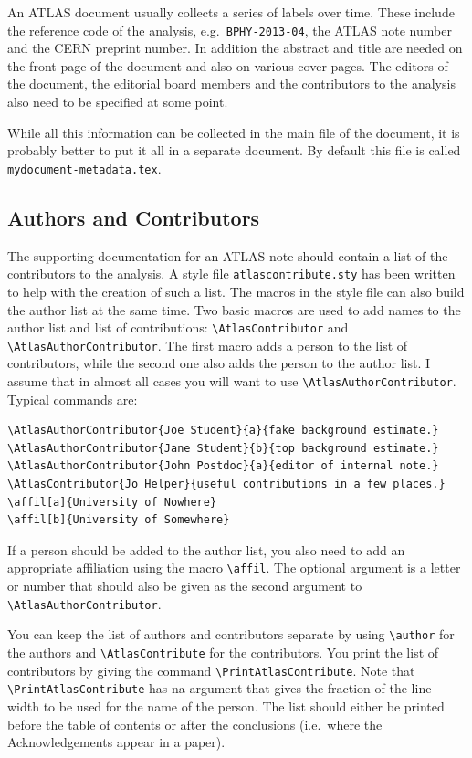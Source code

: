 \documentclass[atlasstyle,UKenglish]{latex/atlasdoc}
\newcommand{\Macro}[1]{\texttt{\textbackslash #1}\xspace}
\newcommand{\Package}[1]{\texttt{#1}\xspace}
\begin{document}
An ATLAS document usually collects a series of labels over time.
These include the reference code of the analysis, e.g.\ \texttt{BPHY-2013-04}, 
the ATLAS note number and the CERN preprint number.
In addition the abstract and title are needed on the front page of the document and also on various cover pages.
The editors of the document, the editorial board members and the contributors to the analysis
also need to be specified at some point.

While all this information can be collected in the main file of the document, 
it is probably better to put it all in a separate document.
By default this file is called \texttt{mydocument-metadata.tex}.


\subsection{Authors and Contributors}
\label{sec:contribute}

The supporting documentation for an ATLAS note should contain a list of the contributors to the analysis.
A style file \Package{atlascontribute.sty} has been written to help with the creation of such a list.
The macros in the style file can also build the author list at the same time.
Two basic macros are used to add names to the author list and list of contributions:
\Macro{AtlasContributor} and \Macro{AtlasAuthorContributor}. 
The first macro adds a person to the list of contributors, while the second one also adds the person
to the author list. I assume that in almost all cases you will want to use \Macro{AtlasAuthorContributor}.
Typical commands are:
\begin{verbatim}
\AtlasAuthorContributor{Joe Student}{a}{fake background estimate.}
\AtlasAuthorContributor{Jane Student}{b}{top background estimate.}
\AtlasAuthorContributor{John Postdoc}{a}{editor of internal note.}
\AtlasContributor{Jo Helper}{useful contributions in a few places.}
\affil[a]{University of Nowhere}
\affil[b]{University of Somewhere}
\end{verbatim}
If a person should be added to the author list, you also need to add an appropriate affiliation using the macro \Macro{affil}.
The optional argument is a letter or number that should also be given as the second argument to
\Macro{AtlasAuthorContributor}.

You can keep the list of authors and contributors separate
by using \Macro{author} for the authors and \Macro{AtlasContribute} for the contributors.
You print the list of contributors by giving the command \Macro{PrintAtlasContribute}.
Note that \Macro{PrintAtlasContribute} has na argument that gives the fraction of the line width
to be used for the name of the person.
The list should either be printed before the table of contents or after the conclusions
(i.e.\ where the Acknowledgements appear in a paper).
\end{document}
